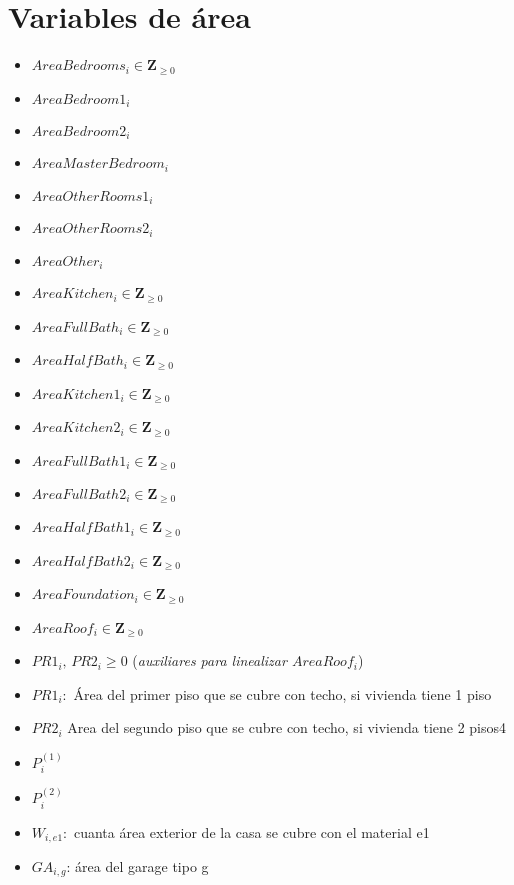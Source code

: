 \documentclass{article}
\begin{document}
\section{Variables de área}
\begin{itemize}
    \item $AreaBedrooms_{i} \in \mathbf{Z}_{\geq 0}$
    \item $AreaBedroom1_{i}$
    \item $AreaBedroom2_{i}$
    \item $AreaMasterBedroom_{i}$
    \item $AreaOtherRooms1_{i}$
    \item $AreaOtherRooms2_{i}$
    \item $AreaOther_{i}$
    \item $AreaKitchen_{i} \in \mathbf{Z}_{\geq 0}$
    \item $AreaFullBath_{i} \in \mathbf{Z}_{\geq 0}$
    \item $AreaHalfBath_{i} \in \mathbf{Z}_{\geq 0}$
    \item $AreaKitchen1_{i} \in \mathbf{Z}_{\geq 0}$
    \item $AreaKitchen2_{i}\in \mathbf{Z}_{\geq 0}$
    \item $AreaFullBath1_{i}\in \mathbf{Z}_{\geq 0}$
    \item $AreaFullBath2_{i}\in \mathbf{Z}_{\geq 0}$
    \item $AreaHalfBath1_{i}\in \mathbf{Z}_{\geq 0}$
    \item $AreaHalfBath2_{i}\in \mathbf{Z}_{\geq 0}$
    \item $AreaFoundation_{i}\in \mathbf{Z}_{\geq 0}$
    \item $AreaRoof_{i} \in \mathbf{Z}_{\geq 0}$
    \item $PR1_i,\, PR2_i \ge 0$ \quad (\textit{auxiliares para linealizar $AreaRoof_i$})
    \item $PR1_{i}:$ Área del primer piso que se cubre con techo, si vivienda tiene 1 piso
    \item $PR2_{i}$ Area del segundo piso que se cubre con techo, si vivienda tiene 2 pisos4
    \item $P_{i}^{(1)}$
    \item $P_{i}^{(2)}$
    \item $W_{i,e1}:$ cuanta área exterior de la casa se cubre con el material e1
    \item $GA_{i,g}$: área del garage tipo g
\end{itemize}
\end{document}
